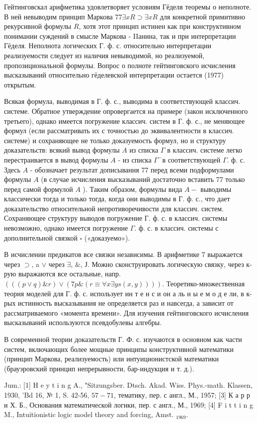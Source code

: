 \documentclass[10pt]{article}
\begin{document}
Гейтинговскал арифметика удовлетворяет условиям Гёделя теоремы о неполноте. В ней невыводим принцип Маркова $77 \exists x R \supset \exists x R$ для конкретной примитивно рекурсивной формулы $R$, хотя этот принцип истинен как при конструктивном понимании суждений в смысле Маркова - IIанина, так и при интерпретации Гёделя. Неполнота логических Г. ф. с. относительно интерпретации реализуемости следует из наличия невыводимой, но реализуемой, пропозициональной формулы. Вопрос о полноте гейтинговского исчисления высказываний относительно гёделевской интерпретации остается (1977) открытым.



Всякая формула, выводимая в Г. ф. с., выводима в соответствующей классич. системе. Обратное утверждение опровергается на примере (закон исключенного третьего), однако имеется погружение классич. систем в Г. ф. с., не меняющее формул (если рассматривать их с точностью до эквивалентности в классич. системе) и сохраняющее не только доказуемость формул, но и структуру доказательств: всякий вывод формулы $A$ из списка $\Gamma$ в классич. системе легко перестраивается в вывод формулы $A$ - из списка $\Gamma^{-}$в соответствующей $\Gamma$. ф. с. Здесь $A$ - обозначает результат дописывания 77 перед всеми подформулами формулы $A$ (в случае исчисления высказываний достаточно вставить 77 только перед самой формулой $A$ ). Таким образом, формулы вида $A-$ выводимы классически тогда и только тогда, когда они выводимы в Г. ф. с., что дает доказательство относительной непротиворечивости для классич. систем. Сохраняющее структуру выводов погружение Г. ф. с. в классич. системы невозможно, однако имеется погружение $\Gamma$. ф. с. в классич. системы с дополнительной связкой $\square$ («доказуемо»).



В исчислении предикатов все связки независимы. В арифметике 7 выражается через $\supset$, a $\vee$ через $\exists$, $\&$, Ј. Можно сконструировать логическую связку, через к-рую выражаются все остальные, напр. $(((p \vee q) \& r) \vee(7 p \&(r \equiv \forall x \exists y s(x, y))))$. Теоретико-множественная теория моделей для Г. ф. с. использует ин т е н с и он а ль н ы е м о д е ли, в к-рых истинность высказывания не определяется раз и навсегда, а зависит от рассматриваемого «момента времени». Для изучения гейтинговского исчисления высказываний используются псевдобулевы алгебры.



В современной теории доказательств Г. Ф. с. изучаются в основном как части систем, включающих более мощные принципы конструктивной математики (принцип Маркова, реализуемость) или интуиционистской математики (брауэровский принцип непрерывности, бар-индукция и т. д.).



Jum.: [1] H e y t i n g A., "Sitzungsber. Dtsch. Akad. Wiss. Phys.-math. Klassen, 1930, 'Bd 16, № 1, S. 42-56, $57-71$, тематику, пер. с англ., М., 1957; [3] К а р р и Х. Б., Основания математической логики, пер. с англ., М., 1969; [4] F i t t i n g M., Intuitionistic logic model theory and forcing, Amst. ${ }_{1969}$.
\end{document}
